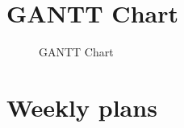 \section{GANTT Chart}
\label{sec:GANTT Chart}
\begin{figure}[H]
	\centering
	\caption{GANTT Chart}
	\label{fig:GANTT Chart}
\end{figure}
\newpage

\section{Weekly plans}
\label{sec:Project Planning}

